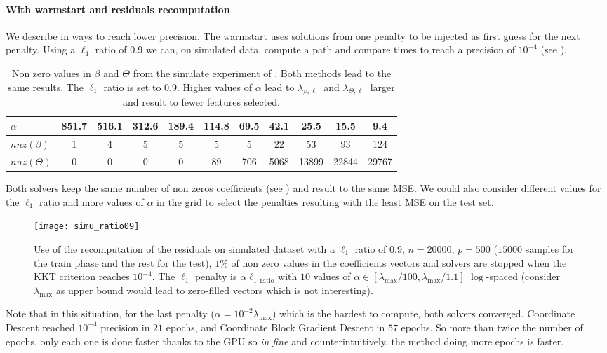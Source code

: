 \documentclass[../main.tex]{subfiles}
\begin{document}
\paragraph*{With warmstart and residuals recomputation}
We describe in  ways to reach lower precision.
The warmstart uses solutions from one penalty to be injected as first guess
for the next penalty.
Using a $\ell_1$ ratio of $0.9$ we can, on simulated data,
compute a path and compare times to reach a precision of $10^{-4}$
(see ).

\begin{table}[ht]
    \caption{Non zero values in $\beta$ and $\Theta$ from the simulate experiment
	of . Both methods lead to the same results.
	The $\ell_1$ ratio is set to $0.9$. Higher values of $\alpha$ lead to
	$\lambda_{\beta, \ell_1}$ and $\lambda_{\Theta,\ell_1}$ larger and result
	to fewer features selected.}
	 \label{tab:nnz}
    \centering
    \begin{tabular}{lcccccccccc}
        \hline
        $\alpha$& 851.7 & 516.1 & 312.6 & 189.4 &
        114.8 & 69.5 & 42.1 & 25.5 &  15.5 & 9.4 \\\hline
        $nnz(\beta)$  & 1 & 4 & 5 & 5 & 5 & 5 & 22 & 53 & 93 & 124 \\
        $nnz(\Theta)$ & 0 & 0 & 0 & 0 & 89 & 706 & 5068 & 13899 & 22844 & 29767
		 \\\hline
    \end{tabular}
\end{table}
Both solvers keep the same number of non zeros coefficients (see )
and result to the same MSE.
We could also consider different values for the $\ell_1$ ratio and more values
of $\alpha$ in the grid to select the penalties resulting with the least MSE
on the test set.
\begin{figure}[!h]
    \centering
    \texttt{[image: simu\_ratio09]}
    \caption{Use of the recomputation of the residuals on simulated dataset
	with a $\ell_1$ ratio of $0.9$, $n=20000$, $p=500$ ($15000$ samples for the
	train phase and the rest for the test), $1\%$ of non zero values in the
	coefficients vectors and solvers are stopped when the KKT criterion reaches
	$10^{-4}$. The $\ell_1$ penalty is $\alpha\ell_1{_{\text{ratio}}}$ with
	$10$ values of $\alpha\in[\lambda_{\max}/100, \lambda_{\max}/1.1]$
	$\log$-spaced (consider $\lambda_{\max}$ as upper bound would lead to
	zero-filled vectors which is not interesting).}
    \label{fig:path_genom}
\end{figure}

\medskip

Note that in this situation, for the last penalty
($\alpha = 10^{-2}\lambda_{\max}$) which is
the hardest to compute, both solvers converged.
Coordinate Descent reached $10^{-4}$ precision in $21$ epochs,
 and Coordinate Block Gradient Descent in $57$ epochs.
So more than twice the number of epochs, only each one is done
faster thanks to the GPU so \emph{in fine} and counterintuitively, the method
doing more epochs is faster.
\end{document}
